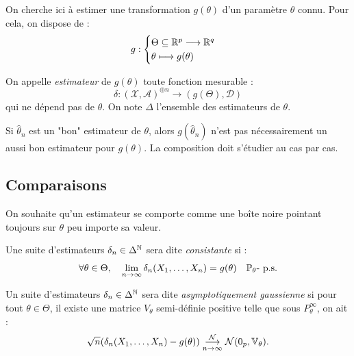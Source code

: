 On cherche ici à estimer une transformation $g( \theta)$ d'un paramètre $ \theta$ 
connu. Pour cela, on dispose de : 
    $$ g : 
        \begin{cases}
            \Theta \subseteq \mathbb{R}^p \longrightarrow \mathbb{R}^q \\ 
            \theta \longmapsto g( \theta)    
        \end{cases}
    $$

\begin{definition}[Estimateur]
    On appelle \emph{estimateur} de $g( \theta)$ toute fonction mesurable : 
        $$ \delta : ( \mathcal{X}, \mathcal{A})^{ \oplus n} \longrightarrow (g(\Theta), \mathcal{D}) $$ 
    qui ne dépend pas de $ \theta$. On note $ \Delta$ l'ensemble des estimateurs de 
    $ \theta$. 
\end{definition}

\begin{remark}
    Si $ \hat{ \theta}_n$ est un "bon" estimateur de $ \theta$, alors $ g( \hat{ \theta}_n)$ 
    n'est pas nécessairement un aussi bon estimateur pour $ g( \theta)$. La composition 
    doit s'étudier au cas par cas. 
\end{remark}

\subsection{Comparaisons}

On souhaite qu'un estimateur se comporte comme une boîte noire pointant toujours 
sur $ \theta$ peu importe sa valeur. 

\begin{definition}
    Une suite d'estimateurs $ \delta_n \in \Delta^{\mathbb{N}}$ sera dite \emph{consistante}
    si : 
        $$ 
            \forall \theta \in \Theta, \quad 
            \lim_{n \to \infty} \delta_n(X_1, \dots, X_n) = g( \theta) \quad \mathbb{P}_\theta \text{- p.s}.
        $$
\end{definition}

\begin{definition}
    Un suite d'estimateurs $ \delta_n \in \Delta^{\mathbb{N}}$ sera dite 
    \emph{asymptotiquement gaussienne} si pour tout $ \theta \in \Theta$, il existe 
    une matrice $ V_\theta$ semi-définie positive telle que sous $P_\theta^\infty$, 
    on ait : 
        $$ \sqrt{n} ( \delta_n(X_1, \dots, X_n) - g(\theta)) 
            \underset{n \to \infty}{\overset{\mathcal{N}}{\longrightarrow}} \mathcal{N}(0_p,\mathbb{V}_\theta). 
        $$
\end{definition}

